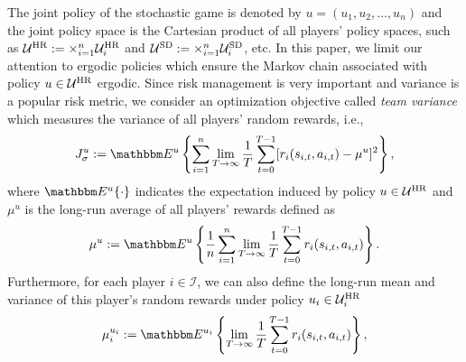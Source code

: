 \documentclass[12pt]{article}
\begin{document}
The joint policy of the stochastic game is denoted by
$u=(u_1,u_2,\dots,u_n)$ and the joint policy space is the Cartesian
product of all players' policy spaces, such as $\mathcal U^{\rm HR}
:= \times_{i=1}^{n} \mathcal U^{\rm HR}_i$ and $\mathcal U^{\rm SD}
:= \times_{i=1}^{n} \mathcal U^{\rm SD}_i$, etc. In this paper, we
limit our attention to ergodic policies which ensure the Markov
chain associated with policy $u \in \mathcal U^{\rm HR}$ ergodic.
Since risk management is very important and variance is a popular
risk metric, we consider an optimization objective called \emph{team
variance} which measures the variance of all players' random
rewards, i.e.,
\begin{equation}\label{eq_teamvar}
J^u_{\sigma} := \mathbbm E^u \left\{ \sum_{i=1}^{n} \lim\limits_{T
\rightarrow \infty} \frac{1}{T}\sum_{t=0}^{T-1}[r_i(s_{i,t},
a_{i,t}) - \mu^u]^2 \right\},
\end{equation}
where $\mathbbm E^u\{\cdot\}$ indicates the expectation induced by
policy $u \in \mathcal U^{\rm HR}$ and $\mu^u$ is the long-run
average of all players' rewards defined as
\begin{equation}\label{eq_teammean}
\mu^u := \mathbbm E^u \left \{ \frac{1}{n}\sum_{i=1}^{n}
\lim\limits_{T \rightarrow \infty} \frac{1}{T}\sum_{t=0}^{T-1}
r_i(s_{i,t}, a_{i,t}) \right \}.
\end{equation}
Furthermore, for each player $i \in \mathcal I$, we can also define
the long-run mean and variance of this player's random rewards under
policy $u_i \in \mathcal U^{\rm HR}_i$
\begin{equation*}
\mu^{u_i}_i := \mathbbm E^{u_i} \left \{ \lim\limits_{T \rightarrow
\infty} \frac{1}{T}\sum_{t=0}^{T-1} r_i(s_{i,t}, a_{i,t}) \right \},
\end{equation*}
\end{document}
